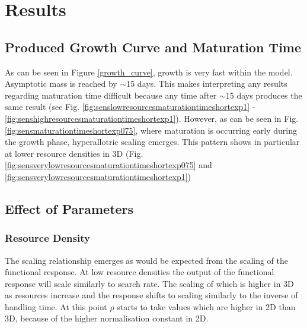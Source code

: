 \documentclass[a4paper, 11pt, hidelinks]{article} %
\begin{document}

	\nolinenumbers
\section{Results}
	\linenumbers
	

	\subsection{Produced Growth Curve and Maturation Time}
	As can be seen in Figure \ref{growth_curve}, growth is very fast within the model.  Asymptotic mass is reached by $\sim$15 days.  This makes interpreting any results regarding maturation time difficult %
	because any time after $\sim$15 days produces the same result (see Fig. \ref{fig:senslowresourcesmaturationtimeshortexp1} - \ref{fig:senshighresourcesmaturationtimeshortexp1}).
	However, as can be seen in Fig. \ref{fig:sensmaturationtimeshortexp075}, where maturation is occurring early during the growth phase, hyperallotric scaling emerges.  This pattern shows in particular at lower resource densities in 3D (Fig. \ref{fig:sensverylowresourcesmaturationtimeshortexp075} and \ref{fig:sensverylowresourcesmaturationtimeshortexp1})
	
	
	\subsection{Effect of Parameters}
	\subsubsection{Resource Density}
	The scaling relationship emerges as would be expected from the scaling of the functional response.  At low resource densities the output of the functional response will scale similarly to search rate.  The scaling of which is higher in 3D as resources increase and the response shifts to scaling similarly to the inverse of handling time.  At this point $\rho$ starts to take values which are higher in 2D than 3D, because of the higher normalisation constant in 2D.
	
\end{document}
